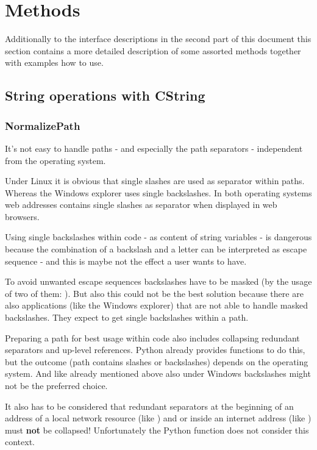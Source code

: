\section{Methods}

Additionally to the interface descriptions in the second part of this document this section contains
a more detailed description of some assorted methods together with examples how to use.

\subsection{String operations with CString}

\subsubsection{NormalizePath}

It's not easy to handle paths - and especially the path separators - independent from the operating system.

Under Linux it is obvious that single slashes are used as separator within paths. Whereas the Windows explorer
uses single backslashes. In both operating systems web addresses contains single slashes as separator
when displayed in web browsers.

Using single backslashes within code - as content of string variables - is dangerous because the combination
of a backslash and a letter can be interpreted as escape sequence - and this is maybe not the effect a user wants to have.

To avoid unwanted escape sequences backslashes have to be masked (by the usage of two of them: ).
But also this could not be the best solution because there are also applications (like the Windows explorer) that are not able to handle
masked backslashes. They expect to get single backslashes within a path.

Preparing a path for best usage within code also includes collapsing redundant separators and up-level references.
Python already provides functions to do this, but the outcome (path contains slashes or backslashes) depends on the
operating system. And like already mentioned above also under Windows backslashes might not be the preferred choice.

It also has to be considered that redundant separators at the beginning of an address of a local network resource
(like ) and or inside an internet address (like ) must \textbf{not} be collapsed!
Unfortunately the Python function  does not consider this context.

